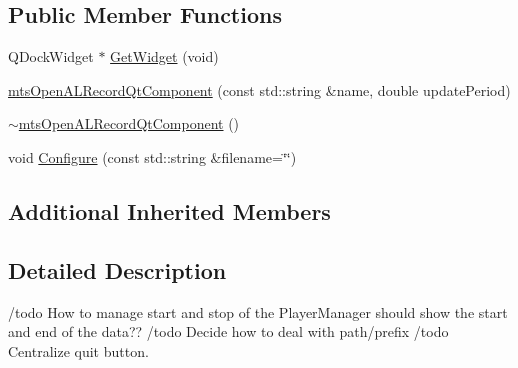 \subsection*{Public Member Functions}
\begin{DoxyCompactItemize}
\item 
Q\+Dock\+Widget $\ast$ \hyperlink{classmts_open_a_l_record_qt_component_a8959b0029546b3471276899a1ef8d700}{Get\+Widget} (void)
\item 
\hyperlink{classmts_open_a_l_record_qt_component_a527dcc751b1db269bc5c03120a1289a4}{mts\+Open\+A\+L\+Record\+Qt\+Component} (const std\+::string \&name, double update\+Period)
\item 
\hyperlink{classmts_open_a_l_record_qt_component_a6222193309e2f6baaa569b5bd613609f}{$\sim$mts\+Open\+A\+L\+Record\+Qt\+Component} ()
\item 
void \hyperlink{classmts_open_a_l_record_qt_component_a94aa08224480eb442fa7d376489146b4}{Configure} (const std\+::string \&filename=\char`\"{}\char`\"{})
\end{DoxyCompactItemize}
\subsection*{Additional Inherited Members}


\subsection{Detailed Description}
/todo How to manage start and stop of the Player\+Manager should show the start and end of the data?? /todo Decide how to deal with path/prefix /todo Centralize quit button. 

